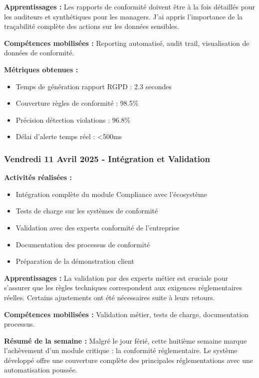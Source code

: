 \textbf{Apprentissages :}
Les rapports de conformité doivent être à la fois détaillés pour les auditeurs et synthétiques pour les managers. J'ai appris l'importance de la traçabilité complète des actions sur les données sensibles.

\textbf{Compétences mobilisées :}
Reporting automatisé, audit trail, visualisation de données de conformité.

\textbf{Métriques obtenues :}
\begin{itemize}
    \item Temps de génération rapport RGPD : 2.3 secondes
    \item Couverture règles de conformité : 98.5\%
    \item Précision détection violations : 96.8\%
    \item Délai d'alerte temps réel : <500ms
\end{itemize}

\subsubsection{Vendredi 11 Avril 2025 - Intégration et Validation}

\textbf{Activités réalisées :}
\begin{itemize}
    \item Intégration complète du module Compliance avec l'écosystème
    \item Tests de charge sur les systèmes de conformité
    \item Validation avec des experts conformité de l'entreprise
    \item Documentation des processus de conformité
    \item Préparation de la démonstration client
\end{itemize}

\textbf{Apprentissages :}
La validation par des experts métier est cruciale pour s'assurer que les règles techniques correspondent aux exigences réglementaires réelles. Certains ajustements ont été nécessaires suite à leurs retours.

\textbf{Compétences mobilisées :}
Validation métier, tests de charge, documentation processus.

\textbf{Résumé de la semaine :}
Malgré le jour férié, cette huitième semaine marque l'achèvement d'un module critique : la conformité réglementaire. Le système développé offre une couverture complète des principales réglementations avec une automatisation poussée.

